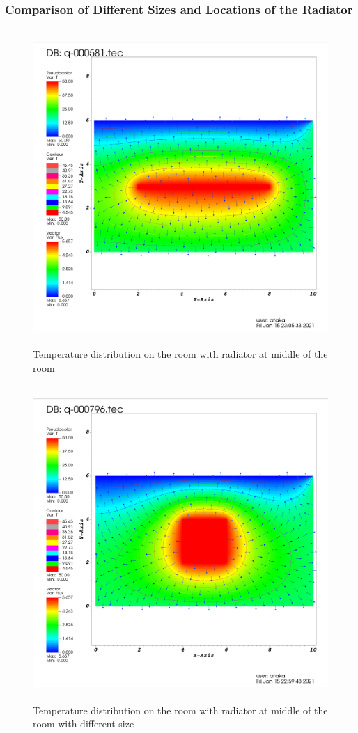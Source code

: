 \documentclass[letterpaper,12pt]{article}
\begin{document}
\subsubsection{Comparison of Different Sizes and Locations of the Radiator}
\begin{figure}[H] 
	\centering 
	\includegraphics[max height=12cm]{graphs/radiator_middle_long/radiator_middle_long.png}
	\caption{Temperature distribution on the room with radiator at middle of the room}
 	\label{fig:middle}
\end{figure}
\begin{figure}[H] 
	\centering 
	\includegraphics[max height=12cm]{graphs/radiator_middle/radiator_middle.png}
	\caption{Temperature distribution on the room with radiator at middle of the room with different size}
 	\label{fig:middlelong}
\end{figure}
\end{document}
